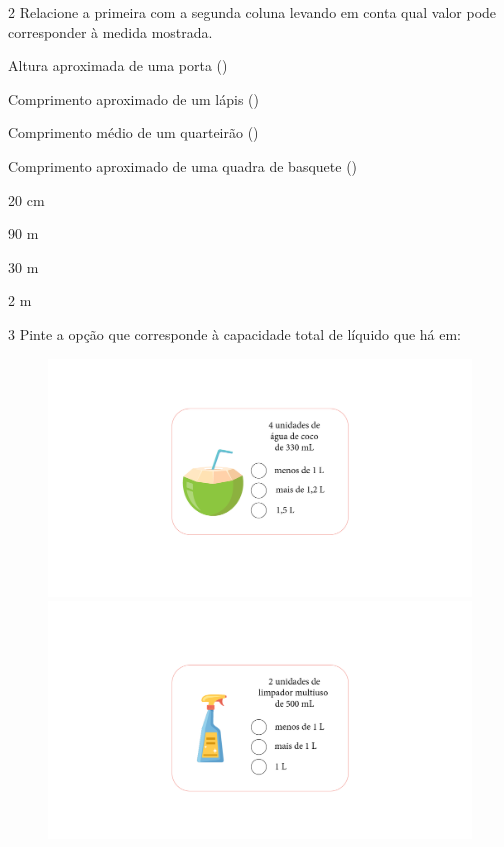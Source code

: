\num{2} Relacione a primeira com a segunda coluna levando em conta qual
valor pode corresponder à medida mostrada.

\begin{multicols}{2}

Altura aproximada de uma porta ()

Comprimento aproximado de um lápis (\coment{20 cm})

Comprimento médio de um quarteirão ()

Comprimento aproximado de uma quadra de basquete ()

\columnbreak

20 cm
 
90 m

30 m
 
2 m
\end{multicols}


\num{3} Pinte a opção que corresponde à capacidade total de líquido que
há em:

\begin{figure}[htpb!]
\includegraphics[width=.5\textwidth]{../ilustracoes/MAT5/SAEB_5ANO_MAT_figura31.png}
\includegraphics[width=.5\textwidth]{../ilustracoes/MAT5/SAEB_5ANO_MAT_figura31a.png}
\end{figure}

